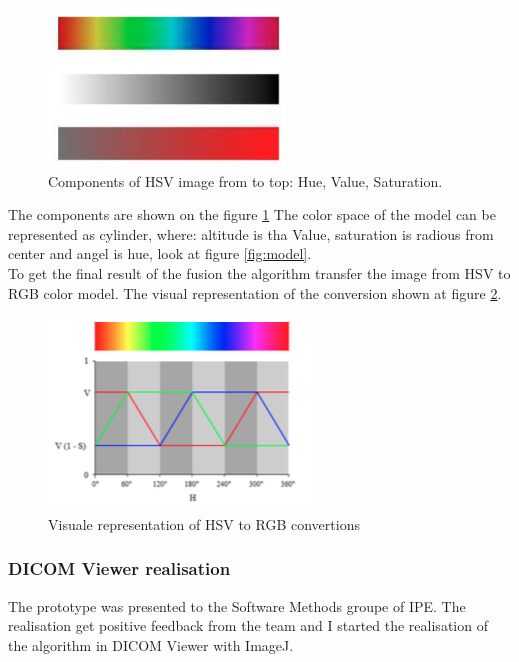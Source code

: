 \documentclass[english]{article}
\begin{document}
\begin{figure}[H]
\centerline{\includegraphics[scale=0.6]{internship_report/hsv}}
\caption{Components of HSV image from to top: Hue, Value, Saturation.\label{fig:hsv}}
\end{figure}

The components are shown on the figure \ref{fig:hsv} The color space of the model can be represented as cylinder, where: altitude is tha Value, saturation is radious from center and angel is hue, look at figure \ref{fig:model}.\\

To get the final result of the fusion the algorithm transfer the image from HSV to RGB color model. The visual representation of the conversion shown at figure \ref{fig:hsv2rgb}.

\begin{figure}[H]
\centerline{\includegraphics[scale=0.7]{internship_report/hsv2rgb}}
\caption{Visuale representation of HSV to RGB convertions\label{fig:hsv2rgb}}
\end{figure}

\subsubsection{DICOM Viewer realisation}

The prototype was presented to the Software Methods groupe of IPE. The realisation get positive feedback from the team and I started the realisation of the algorithm in DICOM Viewer with ImageJ.\\
\end{document}
